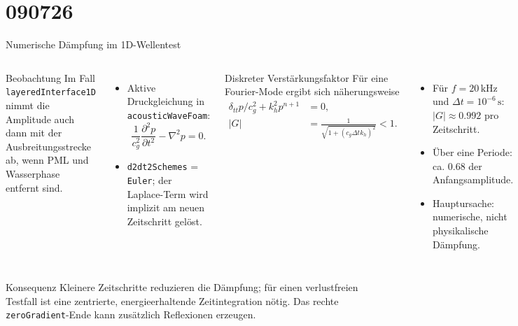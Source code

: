 \documentclass[
	german,%
	accentcolor=9c,%
	accept-missing-logos=true,%
]{tudabeamer}
\newcommand*{\code}[1]{\texttt{#1}}
\begin{document}
\section{090726}
\begin{frame}{Numerische Dämpfung im 1D-Wellentest}
    \scriptsize
    \setlength{\abovedisplayskip}{0.04cm}
    \setlength{\belowdisplayskip}{0.04cm}
    \begin{columns}[T]
    \begin{block}{Beobachtung}
        Im Fall \code{layeredInterface1D} nimmt die Amplitude auch dann mit der
        Ausbreitungsstrecke ab, wenn PML und Wasserphase entfernt sind.
    \end{block}
    \begin{itemize}
        \setlength{\itemsep}{0.05cm}
        \item Aktive Druckgleichung in \code{acousticWaveFoam}:
        \[
            \frac{1}{c_g^2}\frac{\partial^2 p}{\partial t^2}
            - \nabla^2 p = 0 .
        \]
        \item \code{d2dt2Schemes} = \code{Euler}; der Laplace-Term wird
        implizit am neuen Zeitschritt gelöst.
    \end{itemize}

    \begin{block}{Diskreter Verstärkungsfaktor}
        Für eine Fourier-Mode ergibt sich näherungsweise
        \[
            \begin{aligned}
                \delta_{tt}p/c_g^2+k_h^2p^{n+1}&=0,\\
                |G|&=\frac{1}{\sqrt{1+(c_g\Delta t k_h)^2}}<1 .
            \end{aligned}
        \]
    \end{block}
    \begin{itemize}
        \setlength{\itemsep}{0.05cm}
        \item Für $f=20\,\mathrm{kHz}$ und $\Delta t=10^{-6}\,\mathrm{s}$:
        $|G|\approx0.992$ pro Zeitschritt.
        \item Über eine Periode: ca. $0.68$ der Anfangsamplitude.
        \item Hauptursache: numerische, nicht physikalische Dämpfung.
    \end{itemize}
    \end{columns}

    \vspace{-0.02cm}
    \begin{block}{Konsequenz}
        Kleinere Zeitschritte reduzieren die Dämpfung; für einen verlustfreien
        Testfall ist eine zentrierte, energieerhaltende Zeitintegration nötig.
        Das rechte \code{zeroGradient}-Ende kann zusätzlich Reflexionen erzeugen.
    \end{block}
\end{frame}
\end{document}
